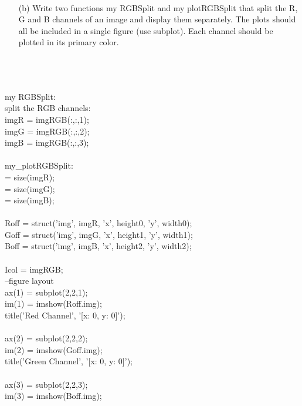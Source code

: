         \\ \pagebreak
    \begin{enumerate}        
        \item[(b)] {Write two functions my RGBSplit and my plotRGBSplit that split the R, G and B channels of an image and display them separately. The plots should all be included in a single figure (use subplot). Each channel should be plotted in its primary color.}
    \end{enumerate}
        \\\\
        \\ my RGBSplit:
        \\ split the RGB channels:
        \\ imgR = imgRGB(:,:,1);
        \\ imgG = imgRGB(:,:,2);
        \\ imgB = imgRGB(:,:,3);
        \\
        \\ my_plotRGBSplit:
        \\ [height0 , width0] = size(imgR);
        \\ [height1 , width1] = size(imgG);
        \\ [height2 , width2] = size(imgB);
        \\
        \\ Roff = struct('img', imgR, 'x', height0, 'y', width0);
        \\ Goff = struct('img', imgG, 'x', height1, 'y', width1);
        \\ Boff = struct('img', imgB, 'x', height2, 'y', width2);
        \\
        \\ Icol = imgRGB;
        \\ --figure layout
        \\ ax(1) = subplot(2,2,1);
        \\ im(1) = imshow(Roff.img);
        \\ title({'Red Channel', '[x: 0, y: 0]'});
        \\
        \\ ax(2) = subplot(2,2,2);
        \\ im(2) = imshow(Goff.img);
        \\ title({'Green Channel', '[x: 0, y: 0]'});
        \\
        \\ ax(3) = subplot(2,2,3);
        \\ im(3) = imshow(Boff.img);
